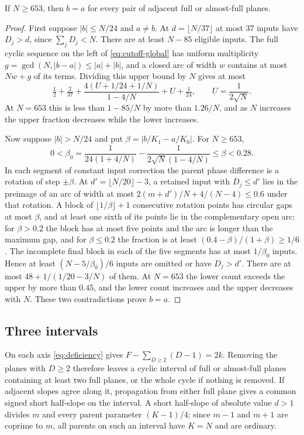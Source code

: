 \documentclass[11pt,colorlinks]{charlie}
\begin{document}
\begin{lemma}\label{lem:adjacent}
If $N\ge653$, then $b=a$ for every pair of adjacent full or almost-full planes.
\end{lemma}

\begin{proof}
First suppose $|b|\le N/24$ and $a\ne b$. At $d=\lfloor N/37\rfloor$ at most $37$ inputs have $D_j>d$, since $\sum_jD_j<N$. There are at least $N-85$ eligible inputs. The full cyclic sequence on the left of \eqref{eq:cutoff-global} has uniform multiplicity $g=\gcd(N,|b-a|)\le|a|+|b|$, and a closed arc of width $w$ contains at most $Nw+g$ of its terms. Dividing this upper bound by $N$ gives at most
\[
 \tfrac12+\tfrac2{37}+\frac{4(U+1/24+1/N)}{1-4/N}+U+\tfrac1{24},\qquad U=\frac1{2\sqrt N}.
\]
At $N=653$ this is less than $1-85/N$ by more than $1.26/N$, and as $N$ increases the upper fraction decreases while the lower increases.

Now suppose $|b|>N/24$ and put $\beta=|b/K_1-a/K_0|$. For $N\ge653$,
\[
 0<\beta_0=\frac1{24(1+4/N)}-\frac1{2\sqrt N(1-4/N)}\le\beta<0.28 .
\]
In each segment of constant input correction the parent phase difference is a rotation of step $\pm\beta$. At $d'=\lfloor N/20\rfloor-3$, a retained input with $D_j\le d'$ lies in the preimage of an arc of width at most $2(m+d')/N+4/(N-4)\le0.6$ under that rotation. A block of $\lfloor1/\beta\rfloor+1$ consecutive rotation points has circular gaps at most $\beta$, and at least one sixth of its points lie in the complementary open arc: for $\beta>0.2$ the block has at most five points and the arc is longer than the maximum gap, and for $\beta\le0.2$ the fraction is at least $(0.4-\beta)/(1+\beta)\ge1/6$. The incomplete final block in each of the five segments has at most $1/\beta_0$ inputs. Hence at least $(N-5/\beta_0)/6$ inputs are omitted or have $D_j>d'$. There are at most $48+1/(1/20-3/N)$ of them. At $N=653$ the lower count exceeds the upper by more than $0.45$, and the lower count increases and the upper decreases with $N$. These two contradictions prove $b=a$.
\end{proof}

\subsection{Three intervals}
On each axis \eqref{eq:deficiency} gives $F-\sum_{D\ge2}(D-1)=2k$. Removing the planes with $D\ge2$ therefore leaves a cyclic interval of full or almost-full planes containing at least two full planes, or the whole cycle if nothing is removed. If adjacent slopes agree along it, propagation from either full plane gives a common signed short half-slope on the interval. A short half-slope of absolute value $d>1$ divides $m$ and every parent parameter $(K-1)/4$; since $m-1$ and $m+1$ are coprime to $m$, all parents on such an interval have $K=N$ and are ordinary.
\end{document}
